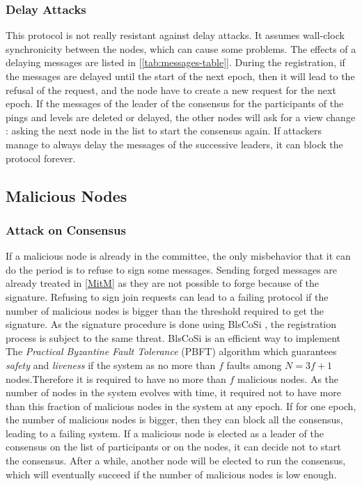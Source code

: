 \documentclass[a4paper,11pt,oneside]{report}
\begin{document}
\subsubsection{Delay Attacks}
This protocol is not really resistant against delay attacks. It assumes
wall-clock synchronicity between the nodes, which can cause some problems. The
effects of a delaying messages are listed in [\autoref{tab:messages-table}]. During
the registration, if the messages are delayed until the start of the next
epoch, then it will lead to the refusal of the request, and the node have to
create a new request for the next epoch. If the messages of the leader of the
consensus for the participants of the pings and levels are deleted or delayed,
the other nodes will ask for a view change : asking the next node in the list
to start the consensus again. If attackers manage to always delay the messages of the successive leaders, it can block the protocol forever.

\subsection{Malicious Nodes}
\subsubsection{Attack on Consensus}
If a malicious node is already in the committee, the only misbehavior that it
can do the period is to refuse to sign some messages. Sending forged messages
are already treated in \autoref{MitM} as they are not possible to forge because
of the signature. Refusing to sign join requests can lead to a failing protocol
if the number of malicious nodes is bigger than the threshold required to get
the signature. As the signature procedure is done using BlsCoSi \cite{Boneh2018},
the registration process is subject to the same threat. BlsCoSi
\cite{Boneh2018} is an efficient way to implement The \textit{Practical
Byzantine Fault Tolerance} (PBFT) \cite{Castro1999} algorithm which guarantees
\textit{safety} and \textit{liveness} if the system as no more than $f$ faults
among $N = 3f+1$ nodes.Therefore it is required to have no more than $f$
malicious nodes. As the number of nodes in the system evolves
with time, it required not to have more than this fraction of malicious nodes
in the system at any epoch. If for one epoch, the number of malicious nodes is
bigger, then they can block all the consensus, leading to a failing system. 
If a malicious node is elected as a leader of the consensus on the list of
participants or on the nodes, it can decide not to start the consensus. After a
while, another node will be elected to run the consensus, which will eventually
succeed if the number of malicious nodes is low enough.
\end{document}
